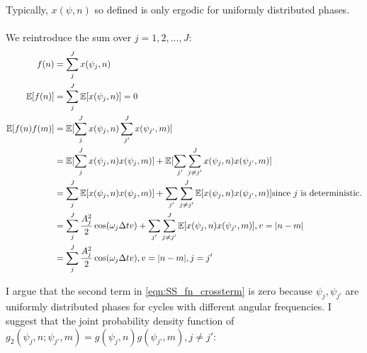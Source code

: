 Typically, $x(\psi, n)$ so defined is only ergodic for uniformly distributed phases. 
\\
\\
We reintroduce the sum over $j = 1, 2, ... , J$:
\begin{align}
f(n) & = \sum_j^J x(\psi_j, n) \\
\mathbb{E}[f(n)] &= \sum_j^J \mathbb{E}[x(\psi_j, n)] = 0 \\
\mathbb{E}[f(n)f(m)] &=  \mathbb{E}[\sum_j^J x(\psi_j, n) \sum_{j'}^{J} x(\psi_{j'}, m)]  \\
 & = \mathbb{E}[\sum_j^J x(\psi_j, n) x(\psi_{j}, m)] + \mathbb{E}[\sum_{j'}\sum_{j\neq j'}^J x(\psi_j, n) x(\psi_{j'}, m)] \\
  & = \sum_j^J \mathbb{E}[x(\psi_j, n) x(\psi_{j}, m)] + \sum_{j'}\sum_{j\neq j'}^J \mathbb{E}[x(\psi_j, n) x(\psi_{j'}, m)]  \text{since $j$ is deterministic.}\\
 & = \sum_j^J \frac{A_j^2}{2} \cos(\omega_j \Delta t v) + \sum_{j'}\sum_{j\neq j'}^J \mathbb{E}[x(\psi_j, n) x(\psi_{j'}, m)], v = |n - m |  \label{eqn:SS_fn_crossterm}\\
 & = \sum_j^J \frac{A_j^2}{2} \cos(\omega_j \Delta t v), v = |n - m |, j = j'
\end{align}
 
 I argue that the second term in \ref{eqn:SS_fn_crossterm} is zero because $\psi_j, \psi_{j'}$ are uniformly distributed phases for cycles with different angular frequencies.
 I suggest that the joint probability density function of $ g_2(\psi_j, n; \psi_{j'}, m) = g(\psi_j, n) g(\psi_{j'}, m), j \neq j'$:

